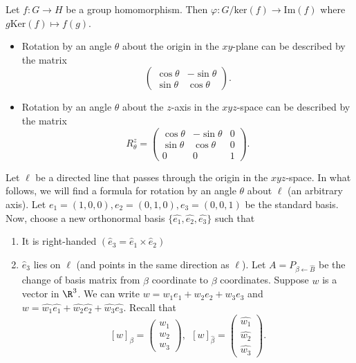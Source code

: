 \begin{theorem}
    Let \( f : G \to H  \) be a group homomorphism. Then \( \varphi : G / \text{ker}(f)  \to \text{Im}(f) \) where \( g \text{Ker}(f) \mapsto f(g) \).
\end{theorem}

\begin{eg}
   \begin{itemize}
       \item Rotation by an angle \( \theta \) about the origin in the \( xy \)-plane can be described by the matrix 
           \[ \begin{pmatrix} \cos \theta & - \sin \theta \\ \sin \theta & \cos \theta  \end{pmatrix}.\]
        \item Rotation by an angle \( \theta  \) about the \( z  \)-axis in the \( xyz \)-space can be described by the matrix
           \[  {R}_{\theta}^{z} = \begin{pmatrix} \cos \theta & - \sin \theta & 0 \\ \sin \theta & \cos \theta & 0 \\ 0 & 0 & 1  \end{pmatrix}. \]
   \end{itemize} 
\end{eg}

\begin{eg}
Let \( \ell  \) be a directed line that passes through the origin in the \( xyz \)-space. In what follows, we will find a formula for rotation by an angle \( \theta  \) about \( \ell \) (an arbitrary axis). Let \( {e}_{1} = (1, 0, 0) , {e}_{2} = (0,1,0) , {e}_{3} = (0, 0, 1 ) \) be the standard basis. Now, choose a new orthonormal basis \( \{ \hat{{e}_{1}}, \hat{{e}_{2}}, \hat{{e}_{3}} \} \) such that
\begin{enumerate}
    \item[(1)] It is right-handed \( (\hat{{e}}_{3} = \hat{{e}}_{1} \times \hat{{e}}_{2}) \)
    \item[(2)] \( {\hat{e}}_{3} \) lies on \( \ell \) (and points in the same direction as \( \ell \)). Let \( A = P_{\beta \leftarrow \hat{B}}  \) be the change of basis matrix from \( \hat{\beta} \) coordinate to \( \beta  \) coordinates. Suppose \( w  \) is a vector in \( \R^{3} \). We can write \( w = {w}_{1} {e}_{1} + {w}_{2} {e}_{2} + {w}_{3} {e}_{3} \) and \( w = \hat{{w}_{1}} \hat{{e}_{1}} + \hat{{w}_{2}} \hat{{e}_{2}} + \hat{{w}_{3}} \hat{{e}_{3}} \). Recall that 
        \[  [  w ]_{\beta } = \begin{pmatrix}  {w}_{1} \\ {w}_{2} \\ {w}_{3}  \end{pmatrix} , \ \ [w]_{\hat{\beta}}  = \begin{pmatrix} \hat{{w}_{1}} \\ \hat{{w}_{2}} \\ \hat{{w}_{3}} \end{pmatrix}.\]
\end{enumerate}
\end{eg}

